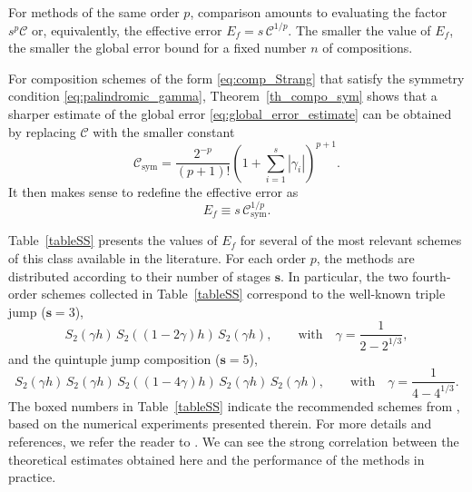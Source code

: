 \documentclass[11pt]{article}
\begin{document}
For methods of the same order $p$, comparison amounts to evaluating the factor $s^p \mathcal{C}$ or, equivalently, the effective error $E_f = s \, \mathcal{C}^{1/p}$. The smaller the value of $E_f$, the smaller the global error bound for a fixed number $n$ of compositions.

For composition schemes of the form \eqref{eq:comp_Strang} that satisfy the symmetry condition \eqref{eq:palindromic_gamma}, 
Theorem~\ref{th_compo_sym} shows that a sharper estimate of the global error \eqref{eq:global_error_estimate} can be obtained by replacing $\mathcal{C}$ with the smaller constant
\begin{equation} \label{valueC_sym}
 \mathcal{C}_{\mathrm{sym}} = \frac{2^{-p}}{(p+1)!} \left(1 + \sum_{i=1}^s |\gamma_i| \right)^{p+1}.
\end{equation}
It then makes sense to redefine the effective error as
\begin{equation}
\label{eq:Ef_sym}
E_f  \equiv s \, \mathcal{C}_{\mathrm{sym}}^{1/p}.
\end{equation}


Table~\ref{tableSS} presents the values of $E_f$ for several of the most relevant schemes of this class available in the literature. For each order $p$, the methods are distributed according to their number of stages $\mathbf{s}$. In particular, the two fourth-order schemes collected in Table~\ref{tableSS} correspond to the well-known triple jump ($\mathbf{s} = 3$),
\begin{equation} \label{triple}
   S_2(\gamma h) \, S_2((1 - 2\gamma) h) \, S_2(\gamma h), \qquad \text{with} \quad \gamma = \frac{1}{2 - 2^{1/3}},
\end{equation}
and the quintuple jump composition ($\mathbf{s} = 5$),
\begin{equation} \label{quintuple}
S_2(\gamma h) \, S_2(\gamma h) \, S_2((1 - 4\gamma) h) \, S_2(\gamma h) \, S_2(\gamma h), \qquad \text{with} \quad 
\gamma = \frac{1}{4 - 4^{1/3}}.
\end{equation}
The boxed numbers in Table~\ref{tableSS} indicate the recommended schemes from \cite{blanes24smf}, based on the numerical experiments presented therein. For more details and references, we refer the reader to \cite[Table 8.1]{blanes24smf}. We can see the strong correlation between the theoretical estimates obtained
here and the performance of the methods in practice.
\end{document}
